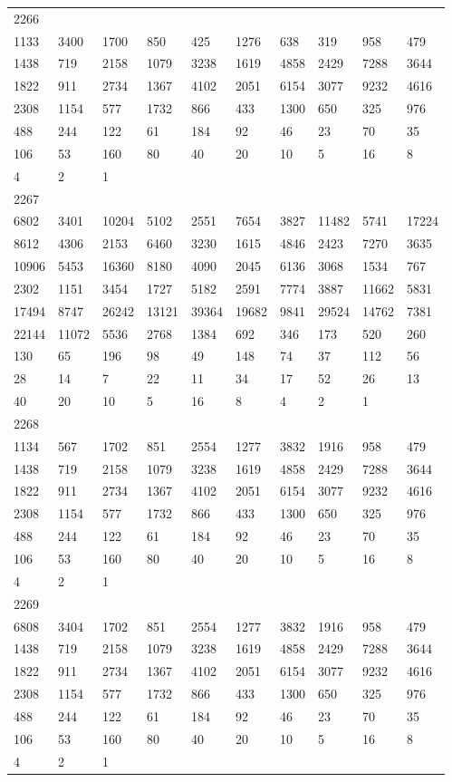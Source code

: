 \begin{longtable}{*{10}{l}}
2266&&&&&&&&&\\
1133& 3400& 1700& 850& 425& 1276& 638& 319& 958& 479\\
1438& 719& 2158& 1079& 3238& 1619& 4858& 2429& 7288& 3644\\
1822& 911& 2734& 1367& 4102& 2051& 6154& 3077& 9232& 4616\\
2308& 1154& 577& 1732& 866& 433& 1300& 650& 325& 976\\
488& 244& 122& 61& 184& 92& 46& 23& 70& 35\\
106& 53& 160& 80& 40& 20& 10& 5& 16& 8\\
4& 2& 1& \\

2267&&&&&&&&&\\
6802& 3401& 10204& 5102& 2551& 7654& 3827& 11482& 5741& 17224\\
8612& 4306& 2153& 6460& 3230& 1615& 4846& 2423& 7270& 3635\\
10906& 5453& 16360& 8180& 4090& 2045& 6136& 3068& 1534& 767\\
2302& 1151& 3454& 1727& 5182& 2591& 7774& 3887& 11662& 5831\\
17494& 8747& 26242& 13121& 39364& 19682& 9841& 29524& 14762& 7381\\
22144& 11072& 5536& 2768& 1384& 692& 346& 173& 520& 260\\
130& 65& 196& 98& 49& 148& 74& 37& 112& 56\\
28& 14& 7& 22& 11& 34& 17& 52& 26& 13\\
40& 20& 10& 5& 16& 8& 4& 2& 1& \\

2268&&&&&&&&&\\
1134& 567& 1702& 851& 2554& 1277& 3832& 1916& 958& 479\\
1438& 719& 2158& 1079& 3238& 1619& 4858& 2429& 7288& 3644\\
1822& 911& 2734& 1367& 4102& 2051& 6154& 3077& 9232& 4616\\
2308& 1154& 577& 1732& 866& 433& 1300& 650& 325& 976\\
488& 244& 122& 61& 184& 92& 46& 23& 70& 35\\
106& 53& 160& 80& 40& 20& 10& 5& 16& 8\\
4& 2& 1& \\

2269&&&&&&&&&\\
6808& 3404& 1702& 851& 2554& 1277& 3832& 1916& 958& 479\\
1438& 719& 2158& 1079& 3238& 1619& 4858& 2429& 7288& 3644\\
1822& 911& 2734& 1367& 4102& 2051& 6154& 3077& 9232& 4616\\
2308& 1154& 577& 1732& 866& 433& 1300& 650& 325& 976\\
488& 244& 122& 61& 184& 92& 46& 23& 70& 35\\
106& 53& 160& 80& 40& 20& 10& 5& 16& 8\\
4& 2& 1& \\


\end{longtable}
